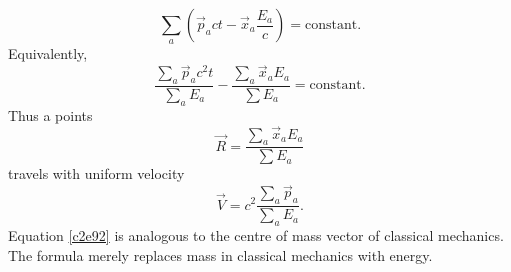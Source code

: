 \begin{enumerate}
\begin{equation}
\sum_a \left(\vec{p}_act - \vec{x}_a\frac{E_a}{c}\right) = \text{constant.}
\end{equation}
Equivalently,
\begin{equation}\label{c2e91}
\frac{\sum_a\vec{p}_ac^2t}{\sum_a E_a} - \frac{\sum_a\vec{x}_a E_a}{\sum E_a} = \text{constant.}
\end{equation}
Thus a points
\begin{equation}\label{c2e92}
\vec{R} = \frac{\sum_a\vec{x}_a E_a}{\sum E_a}
\end{equation}
travels with uniform velocity
\begin{equation}\label{c2e93}
\vec{V} = c^2\frac{\sum_a\vec{p}_a}{\sum_a E_a}.
\end{equation}
Equation \eqref{c2e92} is analogous to the centre of mass vector of classical 
mechanics. The formula merely replaces mass in classical mechanics with energy.
\end{enumerate}
